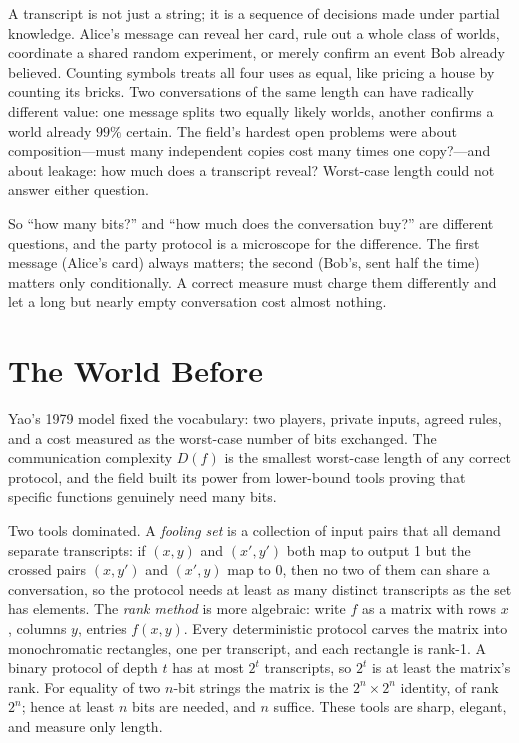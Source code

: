 A transcript is not just a string; it is a sequence of decisions made under partial knowledge. Alice's message can reveal her card, rule out a whole class of worlds, coordinate a shared random experiment, or merely confirm an event Bob already believed. Counting symbols treats all four uses as equal, like pricing a house by counting its bricks. Two conversations of the same length can have radically different value: one message splits two equally likely worlds, another confirms a world already $99\%$ certain. The field's hardest open problems were about composition---must many independent copies cost many times one copy?---and about leakage: how much does a transcript reveal? Worst-case length could not answer either question.

So ``how many bits?'' and ``how much does the conversation buy?'' are different questions, and the party protocol is a microscope for the difference. The first message (Alice's card) always matters; the second (Bob's, sent half the time) matters only conditionally. A correct measure must charge them differently and let a long but nearly empty conversation cost almost nothing.

\section{The World Before}
Yao's 1979 model fixed the vocabulary: two players, private inputs, agreed rules, and a cost measured as the worst-case number of bits exchanged. The communication complexity $D(f)$ is the smallest worst-case length of any correct protocol, and the field built its power from lower-bound tools proving that specific functions genuinely need many bits.

Two tools dominated. A \emph{fooling set} is a collection of input pairs that all demand separate transcripts: if $(x,y)$ and $(x',y')$ both map to output 1 but the crossed pairs $(x,y')$ and $(x',y)$ map to 0, then no two of them can share a conversation, so the protocol needs at least as many distinct transcripts as the set has elements. The \emph{rank method} is more algebraic: write $f$ as a matrix with rows $x$, columns $y$, entries $f(x,y)$. Every deterministic protocol carves the matrix into monochromatic rectangles, one per transcript, and each rectangle is rank-1. A binary protocol of depth $t$ has at most $2^t$ transcripts, so $2^t$ is at least the matrix's rank. For equality of two $n$-bit strings the matrix is the $2^n\times 2^n$ identity, of rank $2^n$; hence at least $n$ bits are needed, and $n$ suffice. These tools are sharp, elegant, and measure only length.

